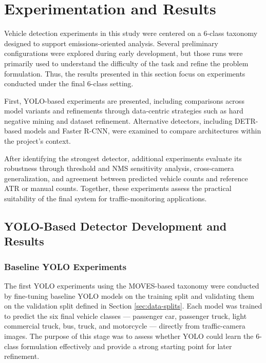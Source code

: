 \newpage
\section{Experimentation and Results}

Vehicle detection experiments in this study were centered on a 6-class taxonomy 
designed to support emissions-oriented analysis. Several preliminary configurations 
were explored during early development, but those runs were primarily used to 
understand the difficulty of the task and refine the problem formulation. Thus,
the results presented in this section focus on experiments conducted under the 
final 6-class setting. 

First, YOLO-based experiments are presented, including comparisons across model
variants and refinements through data-centric strategies such as hard negative 
mining and dataset refinement. Alternative detectors, including DETR-based models and Faster
R-CNN, were examined to compare architectures within the project’s context. 

After identifying the strongest detector, additional experiments evaluate its 
robustness through threshold and NMS sensitivity analysis, cross-camera generalization,
and agreement between predicted vehicle counts and reference ATR or manual counts. 
Together, these experiments assess the practical suitability of the final system 
for traffic-monitoring applications.


\subsection{YOLO-Based Detector Development and Results}

\subsubsection{Baseline YOLO Experiments}

The first YOLO experiments using the MOVES-based taxonomy were conducted by 
fine-tuning baseline YOLO models on the training split and validating them on 
the validation split defined in Section \ref{sec:data-splits}. Each model was 
trained to predict the six final vehicle classes --- passenger car, passenger truck, 
light commercial truck, bus, truck, and motorcycle --- directly from traffic-camera 
images. The purpose of this stage was to assess whether YOLO could learn the 
6-class formulation effectively and provide a strong starting point for later 
refinement.

